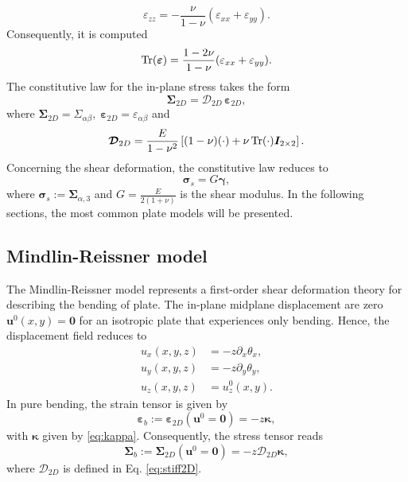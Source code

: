 \begin{equation*}
\varepsilon_{zz} = - \frac{\nu}{1 - \nu} (\varepsilon_{xx} + \varepsilon_{yy}).
\end{equation*}
Consequently, it is computed
\begin{equation*}
\operatorname{Tr}(\bm{\varepsilon}) = \frac{1 - 2\nu}{1 - \nu} (\varepsilon_{xx} + \varepsilon_{yy}).
\end{equation*}
The constitutive law for the in-plane stress takes the form
\begin{equation*}
\bm{\Sigma}_{2D} = \bm{\mathcal{D}}_{2D} \, \bm{\varepsilon}_{2D},
\end{equation*}
where $\bm{\Sigma}_{2D} = \Sigma_{\alpha\beta}, \; \bm{\varepsilon}_{2D} = \varepsilon_{\alpha\beta}$ and 
\begin{equation}\label{eq:stiff2D}
\bm{\mathcal{D}}_{2D} = \frac{E}{1-\nu^2}\left[ (1-\nu) (\cdot) + {\nu} \operatorname{Tr}(\cdot) \bm{I}_{2\times 2} \right].
\end{equation}
Concerning the shear deformation, the constitutive law reduces to 
\begin{equation}
\bm{\sigma}_s = G \bm{\gamma},
\end{equation}
where $\bm{\sigma}_s := \bm{\Sigma}_{\alpha, 3}$ and $G = \frac{E}{2(1 + \nu)}$ is the shear modulus. In the following sections, the most common plate models will be presented.

\subsection{Mindlin-Reissner model}\label{sec:minClas}
The Mindlin-Reissner model \cite{reissner1947bending,mindlin1951} represents a first-order shear deformation theory for describing the bending of plate. The in-plane midplane displacement are zero $\bm{u}^0(x,y)=\bm{0}$ for an isotropic plate that experiences only bending. Hence, the displacement field reduces to
\begin{equation}
\begin{aligned}
u_x(x,y,z) &= -z \partial_x \theta_x, \\
u_y(x,y,z) &= -z \partial_y \theta_y, \\
u_z(x,y,z) &= u_z^0(x,y).
\end{aligned}
\end{equation}
In pure bending, the strain tensor is given by
\begin{equation*}
\bm{\varepsilon}_b := \bm\varepsilon_{2D}(\bm{u}^0=\bm{0}) = -z \bm{\kappa},
\end{equation*}
with $\bm\kappa$ given by \eqref{eq:kappa}. Consequently, the stress tensor reads
\begin{equation*}
\bm{\Sigma}_b := \bm{\Sigma}_{2D}(\bm{u}^0=\bm{0}) = -z \bm{\mathcal{D}}_{2D} \bm{\kappa},
\end{equation*}
where $\bm{\mathcal{D}}_{2D}$ is defined in Eq. \eqref{eq:stiff2D}. \\

